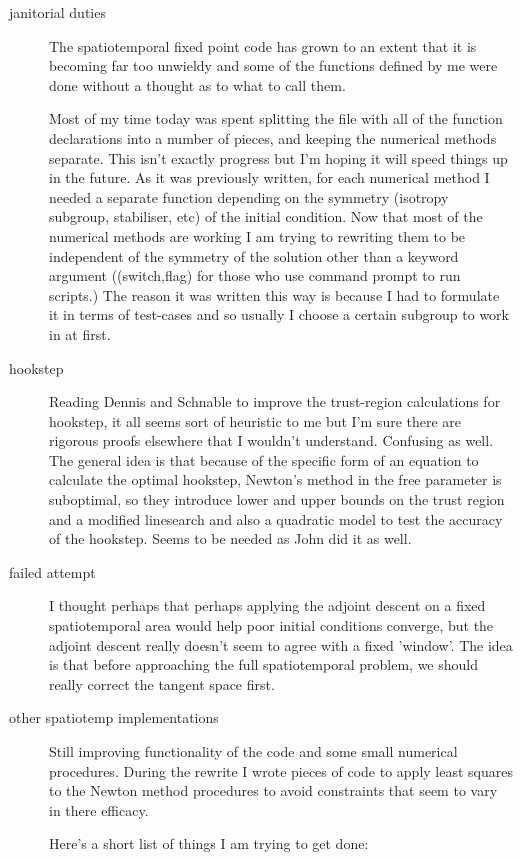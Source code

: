 \begin{description}
{\begin{description}
\item[janitorial duties]
The spatiotemporal fixed point code has grown to an extent that it is becoming far too unwieldy and
some of the functions defined by me were done without a thought as to what to call them.

Most of my time today was spent splitting the file with all of the function declarations into
a number of pieces, and keeping the numerical methods separate. This isn't exactly progress
but I'm hoping it will speed things up in the future. As it was previously written, for each
numerical method I needed a separate function depending on the symmetry (isotropy subgroup,
stabiliser, etc) of the initial condition. Now that most of the numerical methods are working
I am trying to rewriting them to be independent of the symmetry of the solution other than
a keyword argument ((switch,flag) for those who use command prompt to run scripts.) The reason
it was written this way is because I had to formulate it in terms of test-cases and so usually
I choose a certain subgroup to work in at first.

\item[hookstep]
Reading Dennis and Schnable to improve the trust-region calculations for hookstep,
it all seems sort of heuristic to me but I'm sure there are rigorous proofs elsewhere that I wouldn't
understand. Confusing as well. The general idea is that because of the specific form of an equation
to calculate the optimal hookstep, Newton's method in the free parameter is suboptimal, so they
introduce lower and upper bounds on the trust region and a modified linesearch and also a quadratic
model to test the accuracy of the hookstep. Seems to be needed as John did it as well.

\item[failed attempt]
I thought perhaps that perhaps applying the adjoint descent on a fixed spatiotemporal area would help
poor initial conditions converge, but the adjoint descent really doesn't seem to agree with a fixed
'window'. The idea is that before approaching the full spatiotemporal problem, we should really correct
the tangent space first.

\item[other spatiotemp implementations]
Still improving functionality of the code and some small numerical procedures.
During the rewrite I wrote pieces of code to apply least squares to the Newton method procedures
to avoid constraints that seem to vary in there efficacy.

Here's a short list
of things I am trying to get done:


\end{description}}
\end{description}

